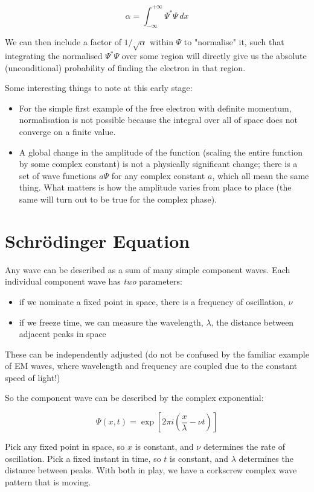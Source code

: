 $$
\alpha =
\int_{-\infty}^{+\infty}
\Psi^*\Psi
\,dx
$$

We can then include a factor of $1/\sqrt{\alpha}$ within $\Psi$ to "normalise" it, such that integrating the normalised $\Psi^*\Psi$ over some region will directly give us the absolute (unconditional) probability of finding the electron in that region.

Some interesting things to note at this early stage:

\begin{itemize}
  \item For the simple first example of the free electron with definite momentum, normalisation is not possible because the integral over all of space does not converge on a finite value.
  \item A global change in the amplitude of the function (scaling the entire function by some complex constant) is not a physically significant change; there is a set of wave functions $a\Psi$ for any complex constant $a$, which all mean the same thing. What matters is how the amplitude varies from place to place (the same will turn out to be true for the complex phase).
\end{itemize}

\section{Schrödinger Equation}

Any wave can be described as a sum of many simple component waves. Each individual component wave has \textit{two} parameters:

\begin{itemize}
  \item if we nominate a fixed point in space, there is a frequency of oscillation, $\nu$
  \item if we freeze time, we can measure the wavelength, $\lambda$, the distance between adjacent peaks in space
\end{itemize}

These can be independently adjusted (do not be confused by the familiar example of EM waves, where wavelength and frequency are coupled due to the constant speed of light!)

So the component wave can be described by the complex exponential:

$$
\Psi(x, t) = \exp \left[ 2\pi i(\frac{x}{\lambda} - \nu t) \right]
$$

Pick any fixed point in space, so $x$ is constant, and $\nu$ determines the rate of oscillation. Pick a fixed instant in time, so $t$ is constant, and $\lambda$ determines the distance between peaks. With both in play, we have a corkscrew complex wave pattern that is moving.

